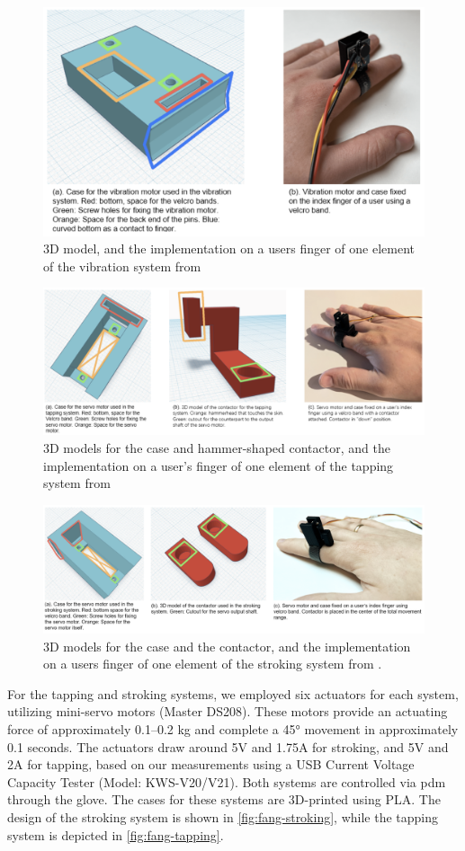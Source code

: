 \begin{figure}
     \centering
     \includegraphics[width=0.5\linewidth]{src/pictures/Screenshot 2024-09-12 at 15.11.57.png}
     \caption{3D model, and the implementation on a users finger of one element of the vibration system from \cite{Fang2023}}
     \label{fig:fang-vibration}
 \end{figure}
\begin{figure}
    \centering
    \includegraphics[width=0.5\linewidth]{src/pictures/Screenshot 2024-09-12 at 15.11.38.png}
    \caption{3D models for the case and hammer-shaped contactor, and the implementation on a user’s finger of one element of the tapping system from \cite{Fang2023}}
    \label{fig:fang-tapping}
\end{figure}
\begin{figure}
    \centering
    \includegraphics[width=0.5\linewidth]{src/pictures/Screenshot 2024-09-12 at 15.10.49.png}
    \caption{3D models for the case and the contactor, and the implementation on a users finger of one element of the stroking system from \cite{Fang2023}.}
    \label{fig:fang-stroking}
\end{figure}

For the tapping and stroking systems, we employed six actuators for each system, utilizing mini-servo motors (Master DS208). These motors provide an actuating force of approximately 0.1–0.2 kg and complete a 45° movement in approximately 0.1 seconds. The actuators draw around 5V and 1.75A for stroking, and 5V and 2A for tapping, based on our measurements using a 
USB Current Voltage Capacity Tester (Model: KWS-V20/V21).
Both systems are controlled via \gls{pdm} through the glove. The cases for these systems are 3D-printed using PLA. The design of the stroking system is shown in \autoref{fig:fang-stroking}, while the tapping system is depicted in \autoref{fig:fang-tapping}.

